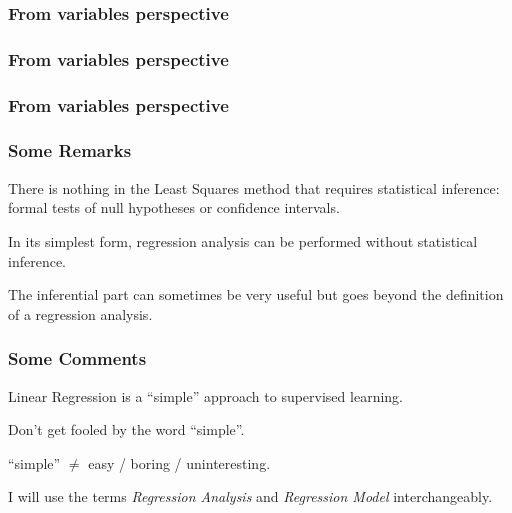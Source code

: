 \documentclass[12pt]{beamer}\usepackage[]{graphicx}\usepackage[]{color}
\begin{document}

\begin{frame}
\frametitle{From variables perspective}
\begin{center}
\end{center}
\end{frame}


\begin{frame}
\frametitle{From variables perspective}
\begin{center}
\end{center}
\end{frame}


\begin{frame}
\frametitle{From variables perspective}
\begin{center}
\end{center}
\end{frame}


\begin{frame}
\frametitle{Some Remarks}

\bbi
  \item There is nothing in the Least Squares method that requires statistical inference:
formal tests of null hypotheses or confidence intervals.
  \item In its simplest form, regression analysis can be performed without statistical inference.
  \item The inferential part can sometimes be very useful but goes beyond the definition of a regression analysis.
\ei

\end{frame}


\begin{frame}
\frametitle{Some Comments}

\bbi
  \item Linear Regression is a ``simple'' approach to supervised learning.
  \item Don't get fooled by the word ``simple''.
  \item ``simple'' $\neq$ easy / boring / uninteresting.
  \item I will use the terms \textit{Regression Analysis} and \textit{Regression Model} interchangeably.
\ei

\end{frame}
\end{document}
